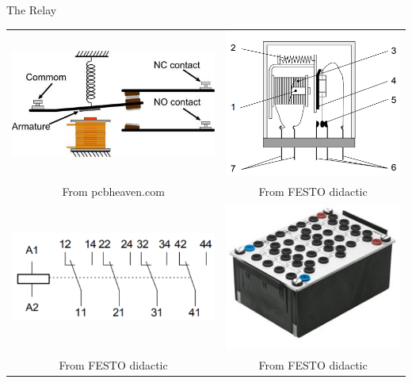 \documentclass[presentation,aspectratio=1610]{beamer}
\begin{document}
\begin{frame}[label={sec:org28f5cfa}]{The Relay}
\begin{center}
\begin{tabular}{cc}
\includegraphics[width=0.4\linewidth]{../../figures/howrelayswork.jpg} &
\includegraphics[width=0.3\linewidth]{../../figures/festo-relay-principle.png}\\
{\tiny From pcbheaven.com} & {\tiny From FESTO didactic}\\
\includegraphics[width=0.35\linewidth]{../../figures/festo-relay-switches.png} &
\includegraphics[width=0.25\linewidth]{../../figures/festo-relay-box.jpg}\\
{\tiny From FESTO didactic} & {\tiny From FESTO didactic}\\
\end{tabular}
\end{center}
\end{frame}
\end{document}
